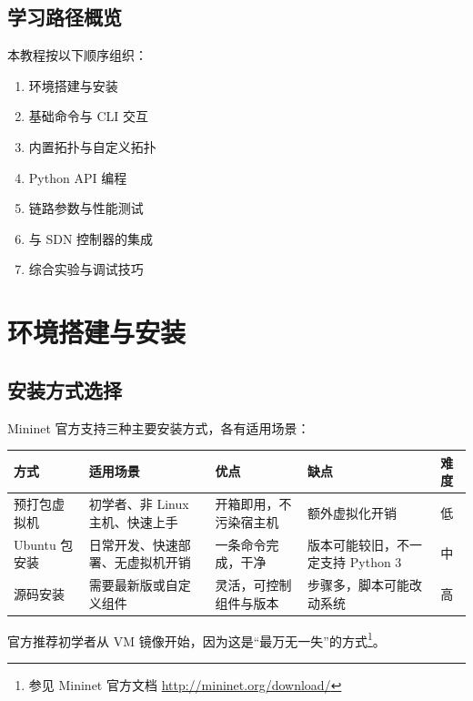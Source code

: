 \documentclass[12pt,a4paper,openany]{ctexbook}
\begin{document}
\section{学习路径概览}

本教程按以下顺序组织：
\begin{enumerate}[leftmargin=*]
	\item 环境搭建与安装
	\item 基础命令与 CLI 交互
	\item 内置拓扑与自定义拓扑
	\item Python API 编程
	\item 链路参数与性能测试
	\item 与 SDN 控制器的集成
	\item 综合实验与调试技巧
\end{enumerate}


\chapter{环境搭建与安装}

\section{安装方式选择}

Mininet 官方支持三种主要安装方式，各有适用场景：

\begin{center}
	\begin{tabular}{@{}p{2.6cm}p{3.2cm}p{3.2cm}p{3.4cm}p{1cm}@{}}
		\toprule
		\textbf{方式} & \textbf{适用场景} & \textbf{优点} & \textbf{缺点} & \textbf{难度} \\
		\midrule
		预打包虚拟机 & 初学者、非 Linux 主机、快速上手 & 开箱即用，不污染宿主机 & 额外虚拟化开销 & 低 \\
		Ubuntu 包安装 & 日常开发、快速部署、无虚拟机开销 & 一条命令完成，干净 & 版本可能较旧，不一定支持 Python 3 & 中 \\
		源码安装 & 需要最新版或自定义组件 & 灵活，可控制组件与版本 & 步骤多，脚本可能改动系统 & 高 \\
		\bottomrule
	\end{tabular}
\end{center}

官方推荐初学者从 VM 镜像开始，因为这是“最万无一失”的方式\footnote{参见 Mininet 官方文档 \url{http://mininet.org/download/}}。
\end{document}
